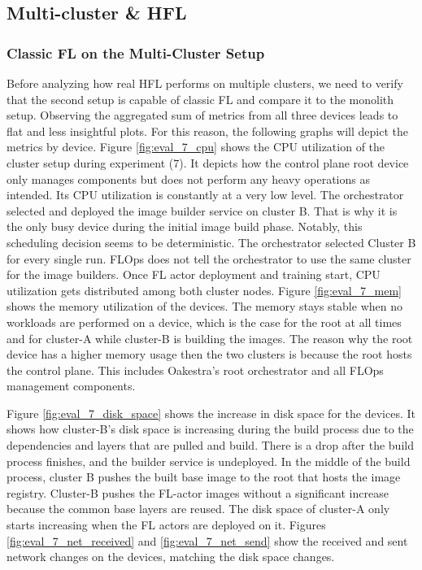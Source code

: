 \subsection{Multi-cluster \& HFL} \label{subsection:eval_multicluster_hfl}

\subsubsection{Classic FL on the Multi-Cluster Setup}

Before analyzing how real HFL performs on multiple clusters, we need to verify that the second setup is capable of classic FL and compare it to the monolith setup.
Observing the aggregated sum of metrics from all three devices leads to flat and less insightful plots.
For this reason, the following graphs will depict the metrics by device.
Figure \ref{fig:eval_7_cpu} shows the CPU utilization of the cluster setup during experiment (7).
It depicts how the control plane root device only manages components but does not perform any heavy operations as intended.
Its CPU utilization is constantly at a very low level.
The orchestrator selected and deployed the image builder service on cluster B.
That is why it is the only busy device during the initial image build phase.
Notably, this scheduling decision seems to be deterministic.
The orchestrator selected Cluster B for every single run.
FLOps does not tell the orchestrator to use the same cluster for the image builders.
Once FL actor deployment and training start, CPU utilization gets distributed among both cluster nodes.
Figure \ref{fig:eval_7_mem} shows the memory utilization of the devices.
The memory stays stable when no workloads are performed on a device, which is the case for the root at all times and for cluster-A while cluster-B is building the images. 
The reason why the root device has a higher memory usage then the two clusters is because the root hosts the control plane.
This includes Oakestra's root orchestrator and all FLOps management components.

Figure \ref{fig:eval_7_disk_space} shows the increase in disk space for the devices.
It shows how cluster-B's disk space is increasing during the build process due to the dependencies and layers that are pulled and build.
There is a drop after the build process finishes, and the builder service is undeployed.
In the middle of the build process, cluster B pushes the built base image to the root that hosts the image registry.
Cluster-B pushes the FL-actor images without a significant increase because the common base layers are reused.
The disk space of cluster-A only starts increasing when the FL actors are deployed on it.
Figures \ref{fig:eval_7_net_received} and \ref{fig:eval_7_net_send} show the received and sent network changes on the devices, matching the disk space changes.

